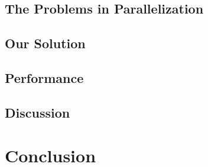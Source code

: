 \documentclass[english,12pt]{article}
\begin{document}

\subsection{The Problems in Parallelization}


\subsection{Our Solution}


\subsection{Performance}


\subsection{Discussion}


\section{Conclusion}

% 
% 
\end{document}
